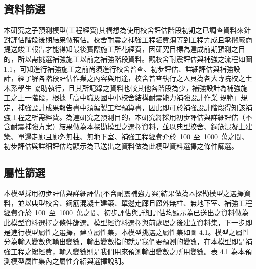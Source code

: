 \subsection{資料篩選}

本研究之子預測模型(工程經費)其構想為使用校舍評估階段初期之已調查資料來針對評估階段後期結果做預估。校舍耐震之補強工程經費須等到工程完成且承攬廠商提送竣工報告才能得知最後實際施工所花經費，因研究目標為達成前期預測之目的，所以需挑選補強施工以前之補強階段資料。觀校舍耐震評估與補強之流程如圖 1.1，可知進行補強施工之前尚須進行校舍普查、初步評估、詳細評估與補強設計，經了解各階段評估作業之內容與用途，校舍普查執行之人員為各大專院校之土木系學生 協助執行，且其所記錄之資料也較其他各階段為少，補強設計為補強施工之上一階段，根據「高中職及國中小校舍結構耐震能力補強設計作業 規範」規定，補強設計成果報告書中須編製工程預算書，因此即可於補強設計階段得知該補強工程之所需經費。為達研究之預測目的，本研究將採用初步評估與詳細評估（不含耐震補強方案）結果做為本探勘模型之選擇資料，並以典型校舍、鋼筋混凝土建築、單邊走廊且廊外無柱、無地下室、補強工程經費介於~100~至~1000~萬之間、初步評估與詳細評估均顯示為已送出之資料做為此模型資料選擇之條件篩選。

\subsection{屬性篩選}

本模型採用初步評估與詳細評估(不含耐震補強方案)結果做為本探勘模型之選擇資料，並以典型校舍、鋼筋混凝土建築、單邊走廊且廊外無柱、無地下室、補強工程經費介於~100~至~1000~萬之間、初步評估與詳細評估均顯示為已送出之資料做為此模型資料選擇之條件篩選。模型經資料選擇與前處理之後建立資料集，下一步即是進行模型屬性之選擇，建立屬性集，本模型挑選之屬性集如圖 4.1。模型之屬性分為輸入變數與輸出變數，輸出變數指的就是我們要預測的變數，在本模型即是補強工程之總經費，輸入變數則是我們用來預測輸出變數之所用變數。表 4.1 為本預測模型屬性集內之屬性介紹與選擇說明。

